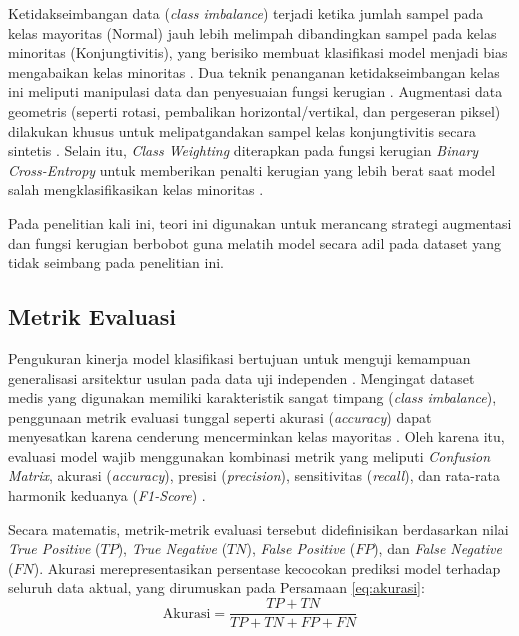 Ketidakseimbangan data (\textit{class imbalance}) terjadi ketika jumlah sampel pada kelas mayoritas (Normal) jauh lebih melimpah dibandingkan sampel pada kelas minoritas (Konjungtivitis), yang berisiko membuat klasifikasi model menjadi bias mengabaikan kelas minoritas \parencite{ali2025investigating, jiang2023automatic}. Dua teknik penanganan ketidakseimbangan kelas ini meliputi manipulasi data dan penyesuaian fungsi kerugian \parencite{ali2025investigating, fuentes2025illumination}. Augmentasi data geometris (seperti rotasi, pembalikan horizontal/vertikal, dan pergeseran piksel) dilakukan khusus untuk melipatgandakan sampel kelas konjungtivitis secara sintetis \parencite{ali2025automated}. Selain itu, \textit{Class Weighting} diterapkan pada fungsi kerugian \textit{Binary Cross-Entropy} untuk memberikan penalti kerugian yang lebih berat saat model salah mengklasifikasikan kelas minoritas \parencite{jiang2023automatic, ali2025investigating}.

Pada penelitian kali ini, teori ini digunakan untuk merancang strategi augmentasi dan fungsi kerugian berbobot guna melatih model secara adil pada dataset yang tidak seimbang pada penelitian ini.

\subsection{Metrik Evaluasi}
\label{subsec:metrik-evaluasi}

Pengukuran kinerja model klasifikasi bertujuan untuk menguji kemampuan generalisasi arsitektur usulan pada data uji independen \parencite{ali2025investigating}. Mengingat dataset medis yang digunakan memiliki karakteristik sangat timpang (\textit{class imbalance}), penggunaan metrik evaluasi tunggal seperti akurasi (\textit{accuracy}) dapat menyesatkan karena cenderung mencerminkan kelas mayoritas \parencite{ali2025investigating, jiang2023automatic}. Oleh karena itu, evaluasi model wajib menggunakan kombinasi metrik yang meliputi \textit{Confusion Matrix}, akurasi (\textit{accuracy}), presisi (\textit{precision}), sensitivitas (\textit{recall}), dan rata-rata harmonik keduanya (\textit{F1-Score}) \parencite{ali2025automated, fuentes2025illumination}.

Secara matematis, metrik-metrik evaluasi tersebut didefinisikan berdasarkan nilai \textit{True Positive} ($TP$), \textit{True Negative} ($TN$), \textit{False Positive} ($FP$), dan \textit{False Negative} ($FN$). Akurasi merepresentasikan persentase kecocokan prediksi model terhadap seluruh data aktual, yang dirumuskan pada Persamaan \ref{eq:akurasi}:
\begin{equation}
  \label{eq:akurasi}
  \text{Akurasi} = \frac{TP + TN}{TP + TN + FP + FN}
\end{equation}

